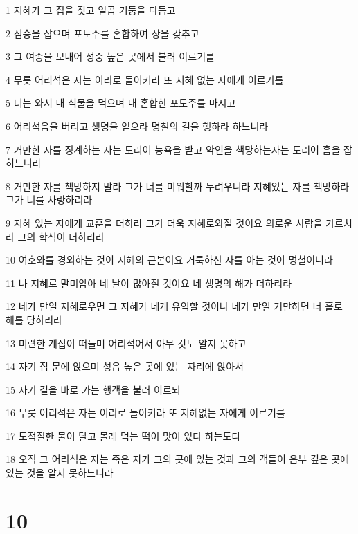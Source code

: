 \par 1 지혜가 그 집을 짓고 일곱 기둥을 다듬고
\par 2 짐승을 잡으며 포도주를 혼합하여 상을 갖추고
\par 3 그 여종을 보내어 성중 높은 곳에서 불러 이르기를
\par 4 무릇 어리석은 자는 이리로 돌이키라 또 지혜 없는 자에게 이르기를
\par 5 너는 와서 내 식물을 먹으며 내 혼합한 포도주를 마시고
\par 6 어리석음을 버리고 생명을 얻으라 명철의 길을 행하라 하느니라
\par 7 거만한 자를 징계하는 자는 도리어 능욕을 받고 악인을 책망하는자는 도리어 흠을 잡히느니라
\par 8 거만한 자를 책망하지 말라 그가 너를 미워할까 두려우니라 지혜있는 자를 책망하라 그가 너를 사랑하리라
\par 9 지혜 있는 자에게 교훈을 더하라 그가 더욱 지혜로와질 것이요 의로운 사람을 가르치라 그의 학식이 더하리라
\par 10 여호와를 경외하는 것이 지혜의 근본이요 거룩하신 자를 아는 것이 명철이니라
\par 11 나 지혜로 말미암아 네 날이 많아질 것이요 네 생명의 해가 더하리라
\par 12 네가 만일 지혜로우면 그 지혜가 네게 유익할 것이나 네가 만일 거만하면 너 홀로 해를 당하리라
\par 13 미련한 계집이 떠들며 어리석어서 아무 것도 알지 못하고
\par 14 자기 집 문에 앉으며 성읍 높은 곳에 있는 자리에 앉아서
\par 15 자기 길을 바로 가는 행객을 불러 이르되
\par 16 무릇 어리석은 자는 이리로 돌이키라 또 지혜없는 자에게 이르기를
\par 17 도적질한 물이 달고 몰래 먹는 떡이 맛이 있다 하는도다
\par 18 오직 그 어리석은 자는 죽은 자가 그의 곳에 있는 것과 그의 객들이 음부 깊은 곳에 있는 것을 알지 못하느니라

\chapter{10}

